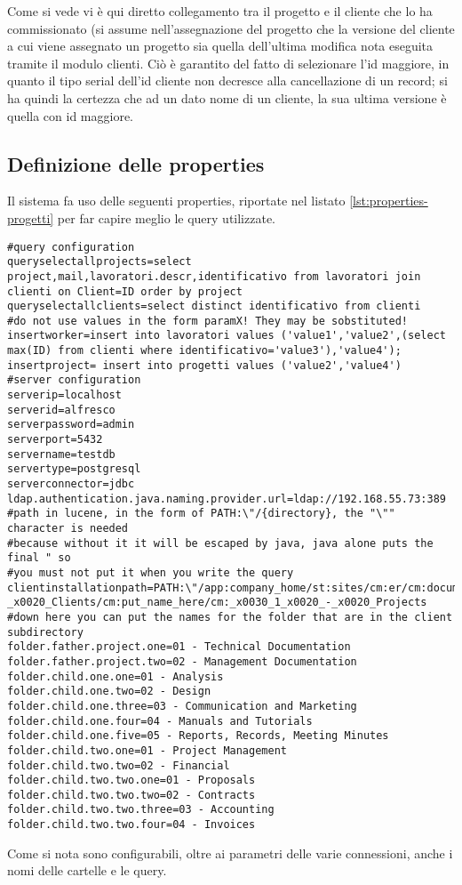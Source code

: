 Come si vede vi è qui diretto collegamento tra il progetto e il cliente che lo ha commissionato (si assume nell’assegnazione del progetto che la versione del cliente a cui viene assegnato un progetto sia quella dell’ultima modifica nota eseguita tramite il modulo clienti. Ciò è garantito del fatto di selezionare l’id maggiore, in quanto il tipo serial dell’id cliente non decresce alla cancellazione di un record; si ha quindi la certezza che ad un dato nome di un cliente, la sua ultima versione è quella con id maggiore.

\subsection{Definizione delle properties}

Il sistema fa uso delle seguenti properties, riportate nel listato \ref{lst:properties-progetti} per far capire meglio le query utilizzate.
\begin{lstlisting}[label=lst:properties-progetti,caption=properties del modulo relativo ai progetti]
#query configuration
queryselectallprojects=select project,mail,lavoratori.descr,identificativo from lavoratori join clienti on Client=ID order by project
queryselectallclients=select distinct identificativo from clienti
#do not use values in the form paramX! They may be sobstituted!
insertworker=insert into lavoratori values ('value1','value2',(select max(ID) from clienti where identificativo='value3'),'value4');
insertproject= insert into progetti values ('value2','value4')
#server configuration
serverip=localhost
serverid=alfresco
serverpassword=admin
serverport=5432
servername=testdb
servertype=postgresql
serverconnector=jdbc
ldap.authentication.java.naming.provider.url=ldap://192.168.55.73:389
#path in lucene, in the form of PATH:\"/{directory}, the "\"" character is needed 
#because without it it will be escaped by java, java alone puts the final " so 
#you must not put it when you write the query
clientinstallationpath=PATH:\"/app:company_home/st:sites/cm:er/cm:documentLibrary/cm:_x0030_2_x0020_-_x0020_Clients/cm:put_name_here/cm:_x0030_1_x0020_-_x0020_Projects
#down here you can put the names for the folder that are in the client subdirectory
folder.father.project.one=01 - Technical Documentation
folder.father.project.two=02 - Management Documentation
folder.child.one.one=01 - Analysis
folder.child.one.two=02 - Design
folder.child.one.three=03 - Communication and Marketing
folder.child.one.four=04 - Manuals and Tutorials
folder.child.one.five=05 - Reports, Records, Meeting Minutes
folder.child.two.one=01 - Project Management
folder.child.two.two=02 - Financial
folder.child.two.two.one=01 - Proposals
folder.child.two.two.two=02 - Contracts
folder.child.two.two.three=03 - Accounting
folder.child.two.two.four=04 - Invoices
\end{lstlisting}
Come si nota sono configurabili, oltre ai parametri delle varie  connessioni, anche i nomi delle cartelle e le query.

